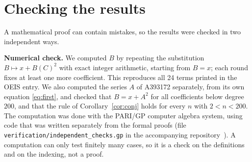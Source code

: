 \documentclass[11pt,a4paper]{article}
\theoremstyle{definition}
\theoremstyle{remark}
\newcommand{\para}[1]{\par\medskip\noindent\textbf{#1}\enspace}
\begin{document}
\section{Checking the results}\label{sec:checks}

A mathematical proof can contain mistakes, so the results were checked in two independent ways.

\para{Numerical check.}
We computed $B$ by repeating the substitution $B\mapsto x+B(C)^2$ with exact integer arithmetic, starting
from $B=x$; each round fixes at least one more coefficient. This reproduces all 24 terms printed in the OEIS entry. We
also computed the series $A$ of A393172 separately, from its own equation \eqref{eq:first}, and checked that $B=x+A^2$
for all coefficients below degree $200$, and that the rule of Corollary~\ref{cor:conj} holds for every $n$ with
$2<n<200$.
The computation was done with the PARI/GP computer algebra system, using code that was written separately from the
formal proofs (file \texttt{verification/independent\_checks.gp} in the accompanying repository~\cite{repo}).
A computation can only test finitely many cases, so it is a check on the definitions and on the indexing, not a proof.
\end{document}

